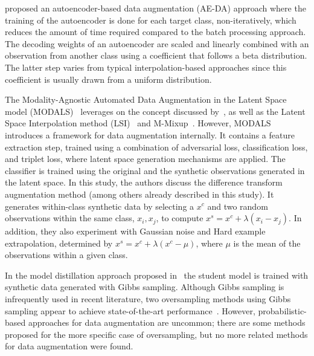 \cite{feng2020autuencoder} proposed an autoencoder-based data augmentation
(AE-DA) approach where the training of the autoencoder is done for each target
class, non-iteratively, which reduces the amount of time required compared to
the batch processing approach. The decoding weights of an autoencoder are
scaled and linearly combined with an observation from another class using a
coefficient that follows a beta distribution. The latter step varies from
typical interpolation-based approaches since this coefficient is usually
drawn from a uniform distribution.

The Modality-Agnostic Automated Data Augmentation in the Latent Space model
(MODALS)~\cite{cheung2020modals} leverages on the concept discussed
by~\cite{DeVries2017}, as well as the Latent Space Interpolation
method (LSI)~\cite{liu2018data} and M-Mixup~\cite{verma2019manifold}.
However, MODALS introduces a framework for data augmentation internally. It
contains a feature extraction step, trained using a combination of adversarial
loss, classification loss, and triplet loss, where latent space generation
mechanisms are applied. The classifier is trained using the original and the
synthetic observations generated in the latent space. In this study, the
authors discuss the difference transform augmentation method (among others already
described in this study). It generates within-class synthetic data by
selecting a $x^c$ and two random observations within the same class, $x_i,
x_j$, to compute $x^s = x^c + \lambda (x_i-x_j)$. In addition, they also
experiment with Gaussian noise and Hard example extrapolation, determined by
$x^s = x^c + \lambda (x^c-\mu)$, where $\mu$ is the mean of the observations
within a given class.

In the model distillation approach proposed in~\cite{fakoor2020fast} the
student model is trained with synthetic data generated with Gibbs sampling.
Although Gibbs sampling is infrequently used in recent literature, two
oversampling methods using Gibbs sampling appear to achieve state-of-the-art
performance~\cite{das2014racog}. However, probabilistic-based approaches for
data augmentation are uncommon; there are some methods proposed for the more
specific case of oversampling, but no more related methods for data
augmentation were found.


